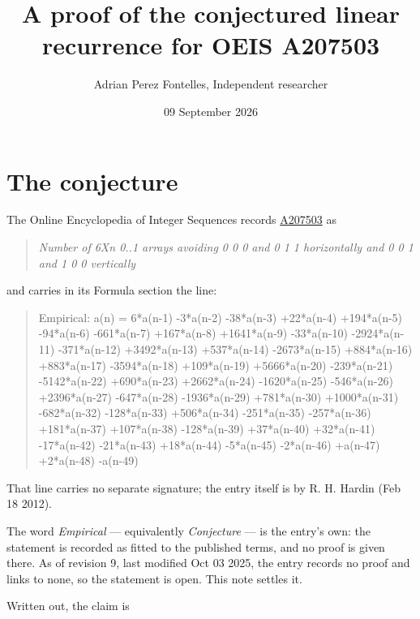 \documentclass[11pt]{article}
\title{A proof of the conjectured linear recurrence for OEIS A207503}
\author{Adrian Perez Fontelles, Independent researcher}
\date{09 September 2026}
\theoremstyle{definition}
\begin{document}
\maketitle
\section{The conjecture}

The Online Encyclopedia of Integer Sequences records \href{https://oeis.org/A207503}{A207503} as

\begin{quote}\itshape Number of 6Xn 0..1 arrays avoiding 0 0 0 and 0 1 1 horizontally and 0 0 1 and 1 0 0 vertically\end{quote}

and carries in its Formula section the line:

\begin{quote}\ttfamily Empirical: a(n) = 6*a(n-1) -3*a(n-2) -38*a(n-3) +22*a(n-4) +194*a(n-5) -94*a(n-6) -661*a(n-7) +167*a(n-8) +1641*a(n-9) -33*a(n-10) -2924*a(n-11) -371*a(n-12) +3492*a(n-13) +537*a(n-14) -2673*a(n-15) +884*a(n-16) +883*a(n-17) -3594*a(n-18) +109*a(n-19) +5666*a(n-20) -239*a(n-21) -5142*a(n-22) +690*a(n-23) +2662*a(n-24) -1620*a(n-25) -546*a(n-26) +2396*a(n-27) -647*a(n-28) -1936*a(n-29) +781*a(n-30) +1000*a(n-31) -682*a(n-32) -128*a(n-33) +506*a(n-34) -251*a(n-35) -257*a(n-36) +181*a(n-37) +107*a(n-38) -128*a(n-39) +37*a(n-40) +32*a(n-41) -17*a(n-42) -21*a(n-43) +18*a(n-44) -5*a(n-45) -2*a(n-46) +a(n-47) +2*a(n-48) -a(n-49)\end{quote}

That line carries no separate signature; the entry itself is by R. H. Hardin (Feb 18 2012).

The word {\itshape Empirical} --- equivalently {\itshape Conjecture} --- is the entry's own: the statement is recorded as fitted to the published terms, and no proof is given there. As of revision 9, last modified Oct 03 2025, the entry records no proof and links to none, so the statement is open. This note settles it.

Written out, the claim is
\end{document}
